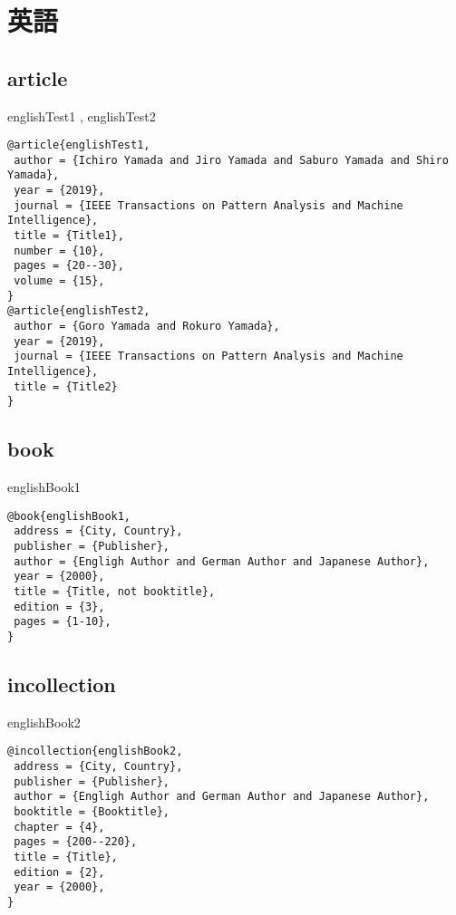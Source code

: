 \documentclass[10pt,a4paper]{article}
\begin{document}
\section{英語}
\subsection{article}

englishTest1 \cite{englishTest1}, 
englishTest2 \cite{englishTest2}

\begin{lstlisting}
@article{englishTest1,
 author = {Ichiro Yamada and Jiro Yamada and Saburo Yamada and Shiro Yamada},
 year = {2019},
 journal = {IEEE Transactions on Pattern Analysis and Machine Intelligence},
 title = {Title1},
 number = {10},
 pages = {20--30},
 volume = {15},
}
@article{englishTest2,
 author = {Goro Yamada and Rokuro Yamada},
 year = {2019},
 journal = {IEEE Transactions on Pattern Analysis and Machine Intelligence},
 title = {Title2}
}
\end{lstlisting}

\subsection{book}
englishBook1 \cite{englishBook1}

\begin{lstlisting}
@book{englishBook1,
 address = {City, Country},
 publisher = {Publisher},
 author = {Engligh Author and German Author and Japanese Author},
 year = {2000},
 title = {Title, not booktitle},
 edition = {3},
 pages = {1-10},
}
\end{lstlisting}

\subsection{incollection}
englishBook2 \cite{englishBook2}

\begin{lstlisting}
@incollection{englishBook2,
 address = {City, Country},
 publisher = {Publisher},
 author = {Engligh Author and German Author and Japanese Author},
 booktitle = {Booktitle},
 chapter = {4},
 pages = {200--220},
 title = {Title},
 edition = {2},
 year = {2000},
}
\end{lstlisting}


% 
% 


\end{document}
